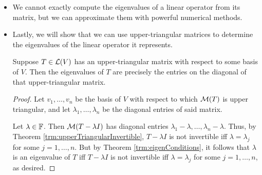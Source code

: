 \documentclass[../main.tex]{subfiles}
\begin{document}
\begin{itemize}
\begin{theorem}
\begin{proof}
            \begin{align*}
                Tv_1 &= \lambda_1v_1+0v_2+\cdots+0v_n\\
                v_1 &= T(v_1/\lambda_1) \in \range T
            \end{align*}
            Similarly, we have that
            \begin{align*}
                Tv_2 &= av_1+\lambda_2v_2+0v_3+\cdots+0v_n\\
                v_2 &= T(v_2/\lambda_2)-\frac{a}{\lambda_2}v_1 \in \range T
            \end{align*}
            since $T(v_2/\lambda_2)$ clearly and linear combinations of $v_1$ are elements of $\range T$ by the previous result. We may analogously prove that $v_3,\dots,v_n\in\range T$, as desired.
        \end{proof}
    \end{theorem}
    \item We cannot exactly compute the eigenvalues of a linear operator from its matrix, but we can approximate them with powerful numerical methods.
    \item Lastly, we will show that we can use upper-triangular matrices to determine the eigenvalues of the linear operator it represents.
    \begin{theorem}
        Suppose $T\in\mathcal{L}(V)$ has an upper-triangular matrix with respect to some basis of $V$. Then the eigenvalues of $T$ are precisely the entries on the diagonal of that upper-triangular matrix.
        \begin{proof}
            Let $v_1,\dots,v_n$ be the basis of $V$ with respect to which $\mathcal{M}(T)$ is upper triangular, and let $\lambda_1,\dots,\lambda_n$ be the diagonal entries of said matrix.\par
            Let $\lambda\in\mathbb{F}$. Then $\mathcal{M}(T-\lambda I)$ has diagonal entries $\lambda_1-\lambda,\dots,\lambda_n-\lambda$. Thus, by Theorem \ref{trm:upperTriangularInvertible}, $T-\lambda I$ is not invertible iff $\lambda=\lambda_j$ for some $j=1,\dots,n$. But by Theorem \ref{trm:eigenConditions}, it follows that $\lambda$ is an eigenvalue of $T$ iff $T-\lambda I$ is not invertible iff $\lambda=\lambda_j$ for some $j=1,\dots,n$, as desired.
        \end{proof}
    \end{theorem}
\end{itemize}
\end{document}
